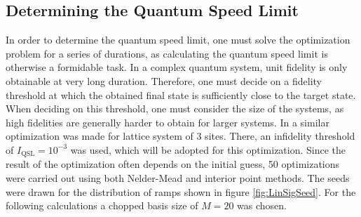 \subsection{Determining the Quantum Speed Limit}
In order to determine the quantum speed limit, one must solve the optimization problem for a series of durations, as calculating the quantum speed limit is otherwise a formidable task. In a complex quantum system, unit fidelity is only obtainable at very long duration. Therefore, one must decide on a fidelity threshold at which the obtained final state is sufficiently close to the target state. When deciding on this threshold, one must consider the size of the systems, as high fidelities are generally harder to obtain for larger systems. In \cite{MajaJulie} a similar optimization was made for lattice system of 3 sites. There, an infidelity threshold of $I_{\mathrm{QSL}} = 10^{-3}$ was used, which will be adopted for this optimization.
Since the result of the optimization often depends on the initial guess, 50 optimizations were carried out using both Nelder-Mead and interior point methods. The seeds were drawn for the distribution of ramps shown in figure \ref{fig:LinSigSeed}. For the following calculations a chopped basis size of $M = 20$ was chosen.

